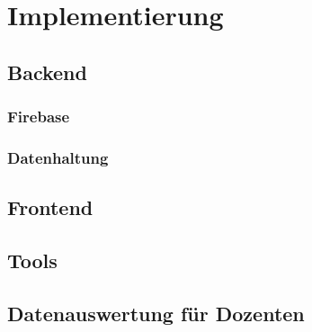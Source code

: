 \chapter{Implementierung}
\section{Backend}
\subsection{Firebase}
\subsection{Datenhaltung}



\section{Frontend}
\section{Tools}
\section{Datenauswertung für Dozenten}






